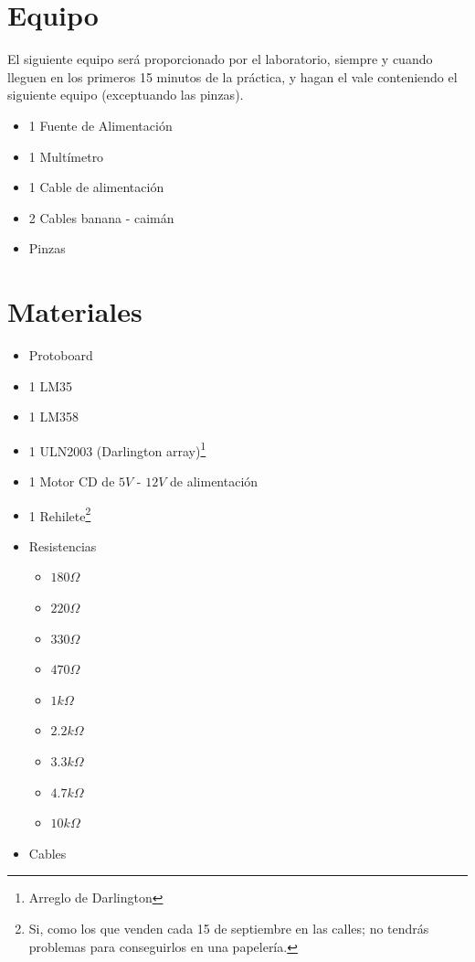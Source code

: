 \section{Equipo}

	El siguiente equipo será proporcionado por el laboratorio, siempre y cuando lleguen en los primeros 15 minutos de la práctica, y hagan el vale conteniendo el siguiente equipo (exceptuando las pinzas).

	\begin{itemize}
		\item 1 Fuente de Alimentación
		\item 1 Multímetro
		\item 1 Cable de alimentación
		\item 2 Cables banana - caimán
		\item Pinzas
	\end{itemize}


\section{Materiales}

	\begin{itemize}
		\item Protoboard
		\item 1 LM35
		\item 1 LM358
		\item 1 ULN2003 (Darlington array)\footnote{Arreglo de Darlington}
		\item 1 Motor CD de $5 V$ - $12 V$ de alimentación
		\item 1 Rehilete\footnote{Si, como los que venden cada 15 de septiembre en las calles; no tendrás problemas para conseguirlos en una papelería.}
		\item Resistencias
		\begin{itemize}
			\item $180 \Omega$
			\item $220 \Omega$
			\item $330 \Omega$
			\item $470 \Omega$
			\item $1 k\Omega$
			\item $2.2 k\Omega$
			\item $3.3 k\Omega$
			\item $4.7 k\Omega$
			\item $10 k\Omega$
		\end{itemize}
		\item Cables
	\end{itemize}

